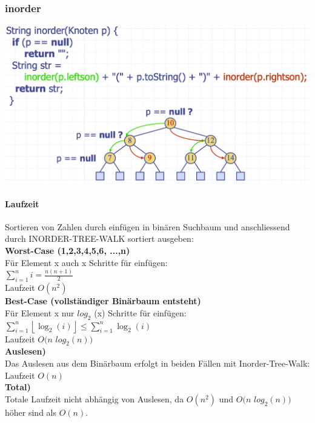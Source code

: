 \subsubsection{inorder}
\begin{center}
    \includegraphics[scale=.22]{graphic/01 BinarySearchTrees/inorder().png}
\end{center}


\paragraph{Laufzeit}
Sortieren von Zahlen durch einfügen in binären Suchbaum und anschliessend durch INORDER-TREE-WALK sortiert ausgeben:\\

\textbf{Worst-Case (1,2,3,4,5,6, ...,n)}\\
Für Element x auch x Schritte für einfügen:\\
$\sum_{i=1}^{n} i=\frac{n(n+1)}{2}$\\
Laufzeit $O(n^2)$\\

\textbf{Best-Case (vollständiger Binärbaum entsteht)}\\
Für Element x nur $log_2$ (x) Schritte für einfügen:\\
$\sum_{i=1}^{n}\left\lfloor\log _{2}(i)\right\rfloor \leq \sum_{i=1}^{n} \log _{2}(i)$\\
Laufzeit $O(n$ $log_2 (n))$\\

\textbf{Auslesen)}\\
Das Auslesen aus dem Binärbaum erfolgt in beiden Fällen mit Inorder-Tree-Walk:\\
Laufzeit $O(n)$\\

\textbf{Total)}\\
Totale Laufzeit nicht abhängig von Auslesen, da  $O(n^2)$ und $O(n$ $log_2 (n))$ höher sind als $O(n)$. 
\newpage